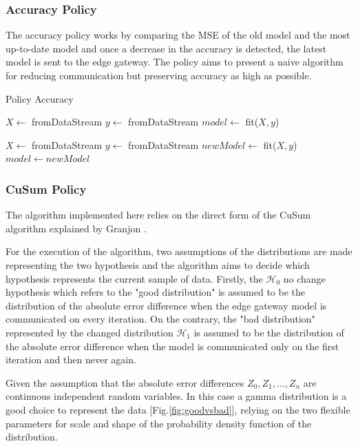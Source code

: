 \documentclass{mpaper}
\begin{document}
\subsubsection{Accuracy Policy}
The accuracy policy works by comparing the MSE of the old model and the most up-to-date model and once a decrease in the accuracy is detected, the latest model is sent to the edge gateway.
The policy aims to present a naive algorithm for reducing communication but preserving accuracy as high as possible.

\begin{algorithm}[h]
\caption{Policy Accuracy}\label{polA}
\begin{algorithmic}
\State $X \gets$ fromDataStream
\State $y \gets$ fromDataStream
\State $model \gets$ fit($X,y$)

    \State $X \gets$ fromDataStream
    \State $y \gets$ fromDataStream
    \State $newModel \gets$ fit($X,y$)
        \State $model \gets newModel$ 
    \EndIf
\EndWhile
\end{algorithmic}
\end{algorithm}

\subsubsection{CuSum Policy}
The algorithm implemented here relies on the direct form of the CuSum algorithm explained by Granjon \cite{cusum_pierre}.

For the execution of the algorithm, two assumptions of the distributions are made representing the two hypothesis and the algorithm aims to decide which hypothesis represents the current sample of data. 
Firstly, the $\mathcal{H}_0$ no change hypothesis which refers to the "good distribution" is assumed to be the distribution of the absolute error difference when the edge gateway model is communicated on every iteration. On the contrary, the "bad distribution" represented by the changed distribution $\mathcal{H}_1$ is assumed to be the distribution of the absolute error difference when the model is communicated only on the first iteration and then never again.

Given the assumption that the absolute error differences $Z_0, Z_1, \dotsc , Z_n $ are continuous independent random variables. In this case a gamma distribution is a good choice to represent the data  [Fig.\ref{fig:goodvsbad}], relying on the two flexible parameters for scale and shape of the probability density function of the distribution.
\end{document}
